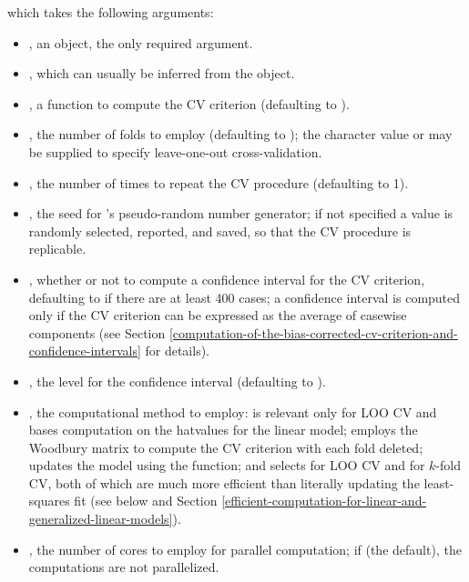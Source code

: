 \documentclass[
]{jss}
\begin{document}
which takes the following arguments:

\begin{itemize}
\item
  , an  object, the only required argument.
\item
  , which can usually be inferred from the 
  object.
\item
  , a function to compute the CV criterion (defaulting
  to ).
\item
  , the number of folds to employ (defaulting to ); the
  character value  or  may be supplied to specify
  leave-one-out cross-validation.
\item
  , the number of times to repeat the CV procedure
  (defaulting to 1).
\item
  , the seed for 's pseudo-random number
  generator; if not specified a value is randomly selected, reported,
  and saved, so that the CV procedure is replicable.
\item
  , whether or not to compute a confidence interval for
  the CV criterion, defaulting to  if there are at least 400
  cases; a confidence interval is computed only if the CV criterion can
  be expressed as the average of casewise components (see Section
  \ref{computation-of-the-bias-corrected-cv-criterion-and-confidence-intervals}
  for details).
\item
  , the level for the confidence interval (defaulting to
  ).
\item
  , the computational method to employ: 
  is relevant only for LOO CV and bases computation on the hatvalues for
  the linear model;  employs the Woodbury matrix to
  compute the CV criterion with each fold deleted; 
  updates the model using the  function; and
   selects  for LOO CV and
   for \(k\)-fold CV, both of which are much more
  efficient than literally updating the least-squares fit (see below and
  Section
  \ref{efficient-computation-for-linear-and-generalized-linear-models}).
\item
  , the number of cores to employ for parallel computation;
  if  (the default), the computations are not
  parallelized.
\end{itemize}
\end{document}
